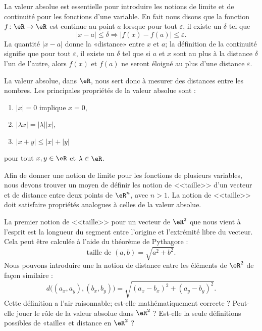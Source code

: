 

La valeur absolue est essentielle pour introduire les notions de limite et de continuité pour les fonctions d'une variable. En fait nous disons que la fonction $f\colon \eR\to \eR$ est continue au point $a$ lorsque pour tout $\varepsilon$, il existe un $\delta$ tel que
\begin{equation}
	| x-a |\leq\delta \Rightarrow | f(x)-f(a) |\leq \varepsilon.
\end{equation}
La quantité $| x-a |$ donne la «distance» entre $x$ et $a$; la définition de la continuité signifie que pour tout $\varepsilon$, il existe un $\delta$ tel que si $a$ et $x$ sont au plus à la distance $\delta$ l'un de l'autre, alors $f(x)$ et $f(a)$ ne seront éloigné au plus d'une distance $\varepsilon$.

La valeur absolue, dans $\eR$, nous sert donc à mesurer des distances entre les nombres. Les principales propriétés de la valeur absolue sont :
\begin{enumerate}

	\item
		$| x |=0$ implique $x=0$,
	\item
		$| \lambda x |=| \lambda | |x |$,
	\item
		$| x+y |\leq | x |+| y |$

\end{enumerate}
pour tout $x,y\in\eR$ et $\lambda\in\eR$.

Afin de donner une notion de limite pour les fonctions de plusieurs variables, nous devons trouver un moyen de définir les notion de <<taille>> d'un vecteur et de distance entre deux points de $\eR^n$, avec $n>1$. La notion de <<taille>> doit satisfaire propriétés analogues à celles de la valeur absolue. 

La premier notion de <<taille>> pour un vecteur de $\eR^2$ que nous vient à l'esprit est la longueur du segment entre l'origine et l'extrémité libre du vecteur. Cela peut être calculée à l'aide du théorème de Pythagore : 
\begin{equation}
  \textrm{taille de } (a,b) = \sqrt{a^2+b^2}.
\end{equation}
Nous pouvons introduire une la notion de distance entre les éléments de $\eR^2$ de façon similaire :
\begin{equation}
	d\big((a_x,a_y),(b_x,b_y)\big)=\sqrt{  (a_x-b_x)^2+(a_y-b_y)^2  }.
\end{equation}
Cette définition a l'air raisonnable; est-elle mathématiquement correcte ? Peut-elle jouer le rôle de la valeur absolue dans $\eR^2$ ? Est-elle la seule définitions possibles de «taille» et distance en $\eR^2$ ?  

